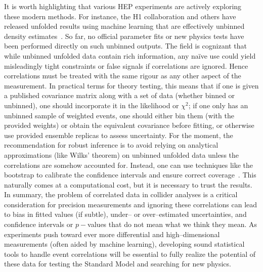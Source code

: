     It is worth highlighting that various HEP experiments are actively exploring these modern methods.
    For instance, the H1 collaboration and others have released unfolded results using machine learning that are effectively unbinned density estimates~.
    So far, no official parameter fits or new physics tests have been performed directly on such unbinned outputs.
    The field is cognizant that while unbinned unfolded data contain rich information, any naïve use could yield misleadingly tight constraints or false signals if correlations are ignored.
    Hence correlations must be treated with the same rigour as any other aspect of the measurement.
    In practical terms for theory testing, this means that if one is given a published covariance matrix along with a set of data (whether binned or unbinned), one should incorporate it in the likelihood or $\chi^2$; if one only has an unbinned sample of weighted events, one should either bin them (with the provided weights) or obtain the equivalent covariance before fitting, or otherwise use provided ensemble replicas to assess uncertainty.
    For the moment, the recommendation for robust inference is to avoid relying on analytical approximations (like Wilks’ theorem) on unbinned unfolded data unless the correlations are somehow accounted for.
    Instead, one can use techniques like the bootstrap to calibrate the confidence intervals and ensure correct coverage~.
    This naturally comes at a computational cost, but it is necessary to trust the results.
    In summary, the problem of correlated data in collider analyses is a critical consideration for precision measurements and ignoring these correlations can lead to bias in fitted values (if subtle), under-- or over--estimated uncertainties, and confidence intervals or $p-$values that do not mean what we think they mean.
    As experiments push toward ever more differential and high--dimensional measurements (often aided by machine learning), developing sound statistical tools to handle event correlations will be essential to fully realize the potential of these data for testing the Standard Model and searching for new physics.

